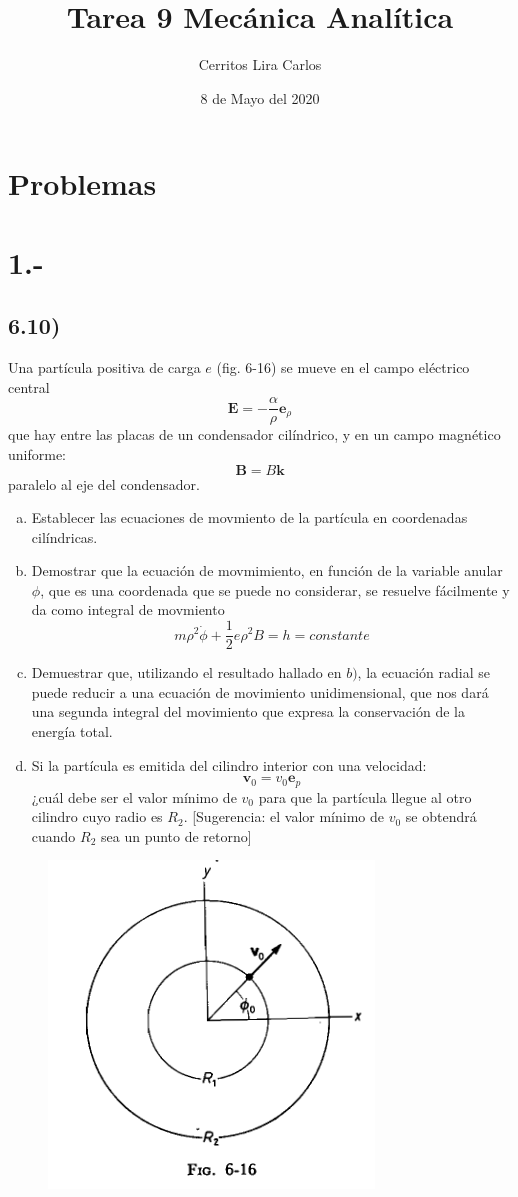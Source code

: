 \documentclass{article}
\title{Tarea 9 Mecánica Analítica}
\author{Cerritos Lira Carlos}
\date{8 de Mayo del 2020}
\begin{document}
\maketitle
\section*{Problemas}
\section*{1.-}
\subsection*{6.10)}
Una partícula positiva de carga $e$ (fig. 6-16) se mueve en el campo eléctrico central
\[ \bm{E} = -\frac{\alpha}{\rho} \bm{e}_{\rho} \]
que hay entre las placas de un condensador cilíndrico, y en un campo magnético uniforme:
\[ \bm{B} = B\bm{k} \]
paralelo al eje del condensador.
\begin{enumerate}[a)]
    \item Establecer las ecuaciones de movmiento de la partícula en coordenadas cilíndricas.
    \item Demostrar que la ecuación de movmimiento, en función de la variable anular $\phi$, que es 
    una coordenada que se puede no considerar, se resuelve fácilmente y da como integral de movmiento 
    \[ m\rho^2\dot{\phi} + \frac{1}{2}e\rho^2B = h = constante \]
    \item Demuestrar que, utilizando el resultado hallado en $b)$, la ecuación radial se puede 
    reducir a una ecuación de movimiento unidimensional, que nos dará una segunda integral del movimiento 
    que expresa la conservación de la energía total. 
    \item Si la partícula es emitida del cilindro interior con una velocidad:
    \[ \bm{v}_0 = v_0\bm{e}_p \]
    ¿cuál debe ser el valor mínimo de $v_0$ para que la partícula llegue al otro cilindro cuyo radio es $R_2$.
    [Sugerencia: el valor mínimo de $v_0$ se obtendrá cuando $R_2$ sea un punto de retorno]
\end{enumerate}
\begin{figure}[H]
    \centering
    \includegraphics[scale=0.6]{images/p1_diagram.png}
\end{figure}
\end{document}
